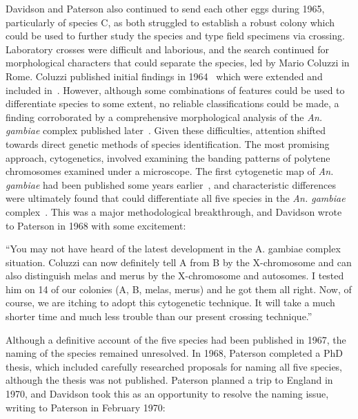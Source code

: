 \documentclass[a4paper,11pt,abstracton,hidelinks]{scrartcl}
\begin{document}
Davidson and Paterson also continued to send each other eggs during 1965, particularly of species C, as both struggled to establish a robust colony which could be used to further study the species and type field specimens via crossing.
%
Laboratory crosses were difficult and laborious, and the search continued for morphological characters that could separate the species, led by Mario Coluzzi in Rome.
%
Coluzzi published initial findings in 1964~\parencite{Coluzzi1964} which were extended and included in~\textcite{Davidson1967}.
%
However, although some combinations of features could be used to differentiate species to some extent, no reliable classifications could be made, a finding corroborated by a comprehensive morphological analysis of the \textit{An. gambiae} complex published later~\parencite{Coetzee1989}.
%
Given these difficulties, attention shifted towards direct genetic methods of species identification.
%
The most promising approach, cytogenetics, involved examining the banding patterns of polytene chromosomes examined under a microscope.
%
The first cytogenetic map of \textit{An. gambiae} had been published some years earlier~\parencite{Frizzi1956}, and characteristic differences were ultimately found that could differentiate all five species in the \textit{An. gambiae} complex~\parencite{Coluzzi1967,Coluzzi1968,Coluzzi1969}.
%
This was a major methodological breakthrough, and Davidson wrote to Paterson in 1968 with some excitement:


\begin{displayquote}
``You may not have heard of the latest development in the A. gambiae complex situation. Coluzzi can now definitely tell A from B by the X-chromosome and can also distinguish melas and merus by the X-chromosome and autosomes. I tested him on 14 of our colonies (A, B, melas, merus) and he got them all right. Now, of course, we are itching to adopt this cytogenetic technique. It will take a much shorter time and much less trouble than our present crossing technique.''
\end{displayquote}


Although a definitive account of the five species had been published in 1967, the naming of the species remained unresolved.
%
In 1968, Paterson completed a PhD thesis, which included carefully researched proposals for naming all five species, although the thesis was not published.
%
Paterson planned a trip to England in 1970, and Davidson took this as an opportunity to resolve the naming issue, writing to Paterson in February 1970:
\end{document}
